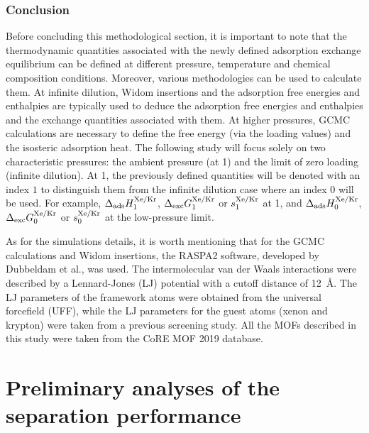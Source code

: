 \documentclass[main.tex]{subfiles}
\begin{document}
\subsubsection{Conclusion}

Before concluding this methodological section, it is important to note that the thermodynamic quantities associated with the newly defined adsorption exchange equilibrium can be defined at different pressure, temperature and chemical composition conditions. Moreover, various methodologies can be used to calculate them. At infinite dilution, Widom insertions and the adsorption free energies and enthalpies are typically used to deduce the adsorption free energies and enthalpies and the exchange quantities associated with them. At higher pressures, GCMC calculations are necessary to define the free energy (via the loading values) and the isosteric adsorption heat. The following study will focus solely on two characteristic pressures: the ambient pressure (at \SI{1}{\atm}) and the limit of zero loading (infinite dilution). At \SI{1}{\atm}, the previously defined quantities will be denoted with an index $1$ to distinguish them from the infinite dilution case where an index $0$ will be used. For example, $\Delta_{\text{ads}}H_{\text{1}}^{\text{Xe/Kr}}$, $\Delta_{\text{exc}}G_{\text{1}}^{\text{Xe/Kr}}$ or $s_{\text{1}}^{\text{Xe/Kr}}$ at \SI{1}{\atm}, and $\Delta_{\text{ads}}H_{\text{0}}^{\text{Xe/Kr}}$, $\Delta_{\text{exc}}G_{\text{0}}^{\text{Xe/Kr}}$ or $s_{\text{0}}^{\text{Xe/Kr}}$ at the low-pressure limit. 

As for the simulations details, it is worth mentioning that for the GCMC calculations and Widom insertions, the RASPA2 software, developed by Dubbeldam et al.\autocite{dubbeldam2016}, was used. The intermolecular van der Waals interactions were described by a Lennard-Jones (LJ) potential with a cutoff distance of \SI{12}{\angstrom}. The LJ parameters of the framework atoms were obtained from the universal forcefield (UFF),\autocite{rappe1992} while the LJ parameters for the guest atoms (xenon and krypton) were taken from a previous screening study.\autocite{Ryan_2010} All the MOFs described in this study were taken from the CoRE MOF 2019 database.\autocite{Chung_2019}


\section{Preliminary analyses of the separation performance}
\end{document}
